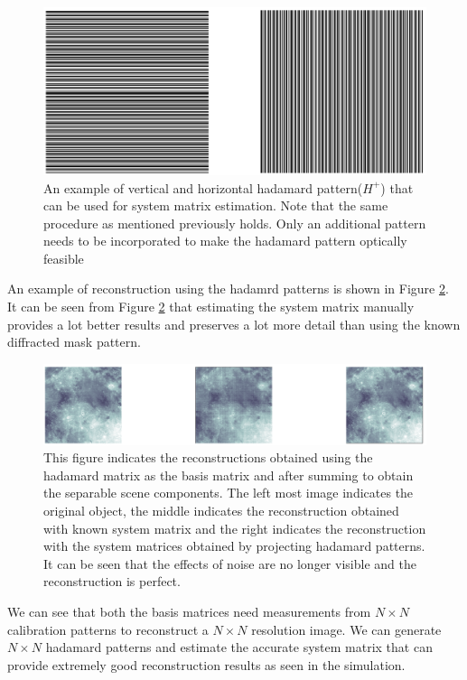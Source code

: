 \begin{figure}[h]
\centering
\includegraphics[width = \linewidth]{pics/hadamard_ex.png}
\caption{An example of vertical and horizontal hadamard pattern($H^+$) that can be used for system matrix estimation. Note that the same procedure as mentioned previously holds. Only an additional pattern needs to be incorporated to make the hadamard pattern optically feasible }
\label{fig:hadamrd_ex}
\end{figure}
An example of reconstruction using the hadamrd patterns is shown in Figure \ref{fig:hadamrd_rec}. It can be seen from Figure \ref{fig:hadamrd_rec} that estimating the system matrix manually provides a lot better results and preserves a lot more detail than using the known diffracted mask pattern. 
\begin{figure}[h]
\centering
\includegraphics[width = \linewidth]{pics/hadamard_rec.png}
\caption{This figure indicates the reconstructions obtained using the hadamard matrix as the basis matrix and after summing to obtain the separable scene components. The left most image indicates the original object, the middle indicates the reconstruction obtained with known system matrix and the right indicates the reconstruction with the system matrices obtained by projecting hadamard patterns. It can be seen that the effects of noise are no longer visible and the reconstruction is perfect. }
\label{fig:hadamrd_rec}
\end{figure}

We can see that both the basis matrices need measurements from $N\times N$ calibration patterns to reconstruct a $N \times N$ resolution image. We can generate $N \times N$ hadamard patterns and estimate the accurate system matrix that can provide extremely good reconstruction results as seen in the simulation.  